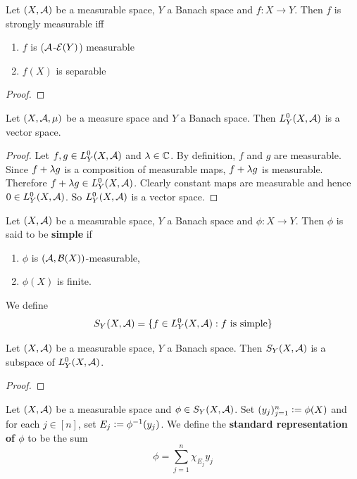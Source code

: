 \documentclass{book}
\begin{document}
	\begin{ex}
		Let $(X, \mathcal{A})$ be a measurable space, $Y$ a Banach space and $f:X \rightarrow Y$. Then $f$ is strongly measurable iff 
		\begin{enumerate}
			\item $f$ is ($\mathcal{A}$-$\mathcal{E}(Y)$) measurable
			\item $f(X)$ is separable
		\end{enumerate}
	\end{ex}

	\begin{proof}
		
	\end{proof}


	
	\begin{ex}  
	Let $(X, \mathcal{A}, \mu)$ be a measure space and $Y$ a Banach space. Then $L_Y^0(X, \mathcal{A})$ is a vector space.
	\end{ex}
	
	\begin{proof}
	Let $f, g \in L_Y^0(X, \mathcal{A})$ and $\lambda \in \mathbb{C}$. By definition, $f$ and $g$ are measurable. Since $f+\lambda g $ is a composition of measurable maps, $f + \lambda g$ is measurable. Therefore $f + \lambda g \in L_Y^0(X, \mathcal{A})$. Clearly constant maps are measurable and hence $0 \in L_Y^0(X, \mathcal{A})$. So $L_Y^0(X, \mathcal{A})$ is a vector space. 
	\end{proof}

	\begin{defn}  
		Let $(X, \mathcal{A})$ be a measurable space, $Y$ a Banach space and $\phi: X \rightarrow Y$. Then $\phi$ is said to be \textbf{simple} if 
		\begin{enumerate}
			\item $\phi$ is $(\mathcal{A}, \mathcal{B}(X))$-measurable,
			\item $\phi(X)$ is finite.
		\end{enumerate}
		We define 
		$$S_Y(X, \mathcal{A}) = \{f \in L_Y^0(X, \mathcal{A}): f \text{ is simple}\}$$
	\end{defn}

	\begin{ex}
		Let $(X, \mathcal{A})$ be a measurable space, $Y$ a Banach space. Then $S_Y(X, \mathcal{A})$ is a subspace of $L^0_Y(X, \mathcal{A})$.
	\end{ex}

	\begin{proof}
	\end{proof}
	
	\begin{defn}
		Let $(X, \mathcal{A})$ be a measurable space and $\phi \in S_Y(X, \mathcal{A})$. Set $(y_j)_{j=1}^n \vcentcolon= \phi(X)$ and for each $j \in [n]$, set $E_j \vcentcolon= \phi^{-1}(y_j)$. We define the \textbf{standard representation of $\phi$} to be the sum 
		$$\phi = \sum\limits_{j=1}^n \chi_{E_j}y_j$$ 
	\end{defn}
\end{document}
